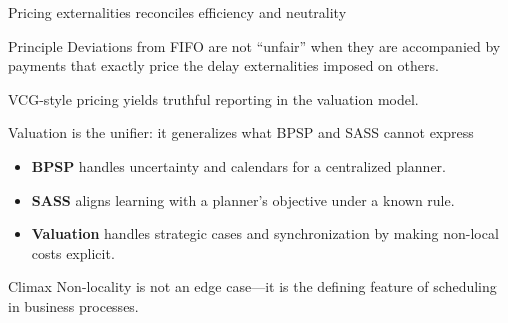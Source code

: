 \documentclass[aspectratio=169,10pt]{beamer}
\newcommand{\btext}[1]{\textbf{\color{darkred}#1}}
\begin{document}
\begin{frame}{Pricing externalities reconciles efficiency and neutrality}
  \begin{block}{Principle}
    Deviations from FIFO are not ``unfair'' when they are accompanied by payments that
    exactly price the delay externalities imposed on others.
  \end{block}
  \vspace{0.15cm}
  \begin{center}
  \end{center}
  \vspace{0.1cm}
  \scriptsize\color{darkgray}
  VCG-style pricing yields truthful reporting in the valuation model.
\end{frame}

\begin{frame}{Valuation is the unifier: it generalizes what BPSP and SASS cannot express}
  \begin{itemize}
    \item \btext{BPSP} handles uncertainty and calendars for a centralized planner.
    \item \btext{SASS} aligns learning with a planner’s objective under a known rule.
    \item \btext{Valuation} handles strategic cases and synchronization by making non-local costs explicit.
  \end{itemize}
  \vspace{0.2cm}
  \begin{block}{Climax}
    Non-locality is not an edge case—it is the defining feature of scheduling in business processes.
  \end{block}
\end{frame}
\fi
\end{document}
